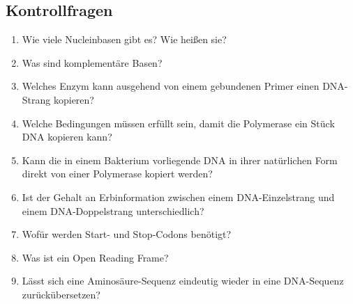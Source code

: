 \subsection{Kontrollfragen}
\begin{enumerate}
	\item Wie viele Nucleinbasen gibt es? Wie heißen sie?
	\item Was sind komplementäre Basen?
	\item Welches Enzym kann ausgehend von einem gebundenen Primer einen DNA-Strang kopieren?
	\item Welche Bedingungen müssen erfüllt sein, damit die Polymerase ein Stück DNA kopieren kann?
	\item Kann die in einem Bakterium vorliegende DNA in ihrer natürlichen Form direkt von einer Polymerase kopiert werden?
	\item Ist der Gehalt an Erbinformation zwischen einem DNA-Einzelstrang und einem DNA-Doppelstrang unterschiedlich?
	\item Wofür werden Start- und Stop-Codons benötigt?
	\item Was ist ein Open Reading Frame?
	\item Lässt sich eine Aminosäure-Sequenz eindeutig wieder in eine DNA-Sequenz zurückübersetzen?
\end{enumerate}

